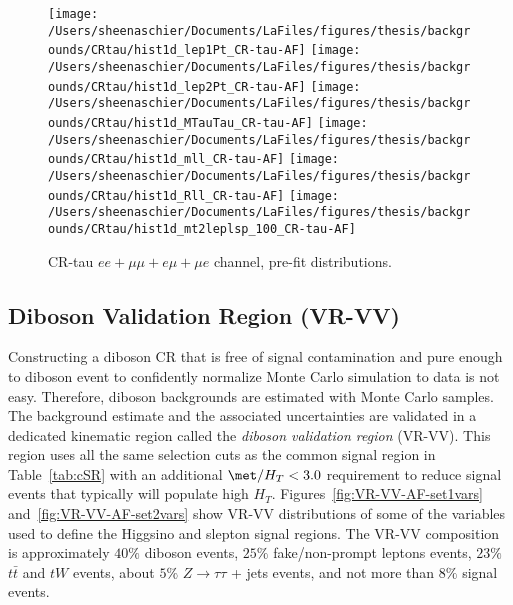 \begin{figure}
    \centering
        \texttt{[image: /Users/sheenaschier/Documents/LaFiles/figures/thesis/backgrounds/CRtau/hist1d\_lep1Pt\_CR-tau-AF]}
        \texttt{[image: /Users/sheenaschier/Documents/LaFiles/figures/thesis/backgrounds/CRtau/hist1d\_lep2Pt\_CR-tau-AF]}
        \texttt{[image: /Users/sheenaschier/Documents/LaFiles/figures/thesis/backgrounds/CRtau/hist1d\_MTauTau\_CR-tau-AF]}
        \texttt{[image: /Users/sheenaschier/Documents/LaFiles/figures/thesis/backgrounds/CRtau/hist1d\_mll\_CR-tau-AF]}
        \texttt{[image: /Users/sheenaschier/Documents/LaFiles/figures/thesis/backgrounds/CRtau/hist1d\_Rll\_CR-tau-AF]}
        \texttt{[image: /Users/sheenaschier/Documents/LaFiles/figures/thesis/backgrounds/CRtau/hist1d\_mt2leplsp\_100\_CR-tau-AF]}
    \caption{CR-tau $ee+\mu\mu +e\mu + \mu e$ channel, pre-fit distributions.}
    \label{fig:CR-tau-2}
\end{figure} 

\FloatBarrier

\subsection{Diboson Validation Region (VR-VV)}
Constructing a diboson CR that is free of signal contamination and pure enough to diboson event to confidently normalize Monte Carlo simulation to data is not easy.  Therefore, diboson backgrounds are estimated with Monte Carlo samples.  The background estimate and the associated uncertainties are validated in a dedicated kinematic region called the \textit{diboson validation region} (VR-VV).  This region uses all the same selection cuts as the common signal region in Table~\ref{tab:cSR} with an additional $\met/H_T<3.0$ requirement to reduce signal events that typically will populate high $H_T$.  Figures~\ref{fig:VR-VV-AF-set1vars} and~\ref{fig:VR-VV-AF-set2vars} show VR-VV distributions of some of the variables used to define the Higgsino and slepton signal regions.  The VR-VV composition is approximately $40\%$ diboson events, $25\%$ fake/non-prompt leptons events, $23\%$ $t\bar{t}$ and $tW$ events, about $5\%$ $Z\rightarrow\tau\tau$ + jets events, and not more than $8\%$ signal events.

